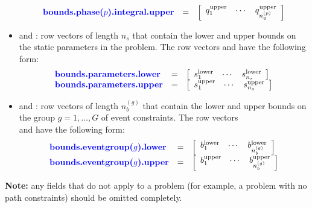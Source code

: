 \documentclass[10pt]{article}
\newcommand{\bfblue}[1]{\textrm{{\color{blue}{\bf #1}}}}
\begin{document}
\begin{itemize}
\begin{displaymath}
\begin{array}{lcl}
   \bfblue{bounds.phase($p$).integral.upper} & = &
  \left[\begin{array}{ccc} q_{1}^{\textrm{upper}} & \cdots & q_{n_q^{(p)}}^{\textrm{upper}}\end{array}\right]
\end{array}
\end{displaymath}
\item \bfblue{bounds.parameters.lower} and \bfblue{bounds.parameters.upper}:
row vectors of length $n_s$ that contain the lower and upper
bounds on the static parameters in the problem.  The row
vectors \bfblue{bounds.parameters.lower} and 
\bfblue{bounds.parameters.upper} have the following form:
\begin{displaymath}
 \begin{array}{lcl}
   \bfblue{bounds.parameters.lower} & = &
  \left[\begin{array}{ccc} s_{1}^{\textrm{lower}} & \cdots & s_{n_s}^{\textrm{lower}}\end{array}\right] \\
   \bfblue{bounds.parameters.upper} & = &
  \left[\begin{array}{ccc} s_{1}^{\textrm{upper}} & \cdots & s_{n_s}^{\textrm{upper}}\end{array}\right] \\
\end{array}
\end{displaymath}
\item \bfblue{bounds.eventgroup($g$).lower} and \bfblue{bounds.eventgroup($g$).upper}:
row vectors of length $n_b^{(g)}$ that contain the lower and upper
bounds on the group $g=1,\ldots,G$ of event constraints.  The row
vectors \\ \bfblue{bounds.eventgroup($g$).lower} and
\bfblue{bounds.eventgroup($g$).upper} have the following form:
\begin{displaymath}
 \begin{array}{lcl}
   \bfblue{bounds.eventgroup($g$).lower} & = & \left[\begin{array}{ccc} b_{1}^{\textrm{lower}} & \cdots & b_{n_b^{(g)}}^{\textrm{lower}}\end{array}\right] \\
   \bfblue{bounds.eventgroup($g$).upper} & = & \left[\begin{array}{ccc} b_{1}^{\textrm{upper}} & \cdots & b_{n_b^{(g)}}^{\textrm{upper}}\end{array}\right]
\end{array}
\end{displaymath}
\end{itemize}
{\noindent}{\bf Note:} any fields that do not apply to a problem (for
example, a problem with no path constraints) should be omitted
completely.  
\end{document}
